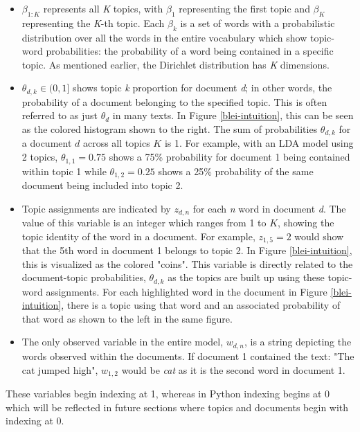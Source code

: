 \documentclass[a4paper, 12pt, twoside]{article}
\numberwithin{equation}{section} %
\begin{document}
\begin{itemize}
\item $\beta_{1:K}$ represents all \textit{K} topics, with $\beta_1$ representing the first topic and $\beta_K$ representing the \textit{K}-th topic. Each $\beta_k$ is a set of words with a probabilistic distribution over all the words in the entire vocabulary which show topic-word probabilities: the probability of a word being contained in a specific topic. As mentioned earlier, the Dirichlet distribution has \textit{K} dimensions.
\item $\theta_{d,k} \in (0, 1]$ shows topic \textit{k} proportion for document \textit{d}; in other words, the probability of a document belonging to the specified topic. This is often referred to as just $\theta_d$ in many texts. In Figure \ref{blei-intuition}, this can be seen as the colored histogram shown to the right. The sum of probabilities $\theta_{d,k}$ for a document $d$ across all topics $K$ is 1. For example, with an LDA model using 2 topics, $\theta_{1,1} = 0.75$ shows a 75\% probability for document 1 being contained within topic 1 while $\theta_{1,2} = 0.25$ shows a 25\% probability of the same document being included into topic 2. 
\item Topic assignments are indicated by $z_{d,n}$ for each \textit{n} word in document \textit{d}. The value of this variable is an integer which ranges from 1 to $K$, showing the topic identity of the word in a document. For example, $z_{1,5} = 2$ would show that the 5th word in document 1 belongs to topic 2. In Figure \ref{blei-intuition}, this is visualized as the colored "coins". This variable is directly related to the document-topic probabilities, $\theta_{d,k}$ as the topics are built up using these topic-word assignments. For each highlighted word in the document in Figure \ref{blei-intuition}, there is a topic using that word and an associated probability of that word as shown to the left in the same figure. 
\item The only observed variable in the entire model, $w_{d,n}$, is a string depicting the words observed within the documents. If document 1 contained the text: "The cat jumped high", $w_{1,2}$ would be \textit{cat} as it is the second word in document 1. 
\end{itemize}

These variables begin indexing at 1, whereas in Python indexing begins at 0 which will be reflected in future sections where topics and documents begin with indexing at 0. 
\end{document}
